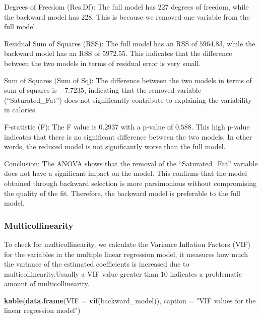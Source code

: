 \documentclass[
]{article}
\newenvironment{Shaded}{\begin{snugshade}}{\end{snugshade}}
\newcommand{\AttributeTok}[1]{\textcolor[rgb]{0.13,0.29,0.53}{#1}}
\newcommand{\FunctionTok}[1]{\textcolor[rgb]{0.13,0.29,0.53}{\textbf{#1}}}
\newcommand{\NormalTok}[1]{#1}
\newcommand{\StringTok}[1]{\textcolor[rgb]{0.31,0.60,0.02}{#1}}
\begin{document}
Degrees of Freedom (Res.Df): The full model has \(227\) degrees of
freedom, while the backward model has \(228\). This is because we
removed one variable from the full model.

Residual Sum of Squares (RSS): The full model has an RSS of \(5964.83\),
while the backward model has an RSS of \(5972.55\). This indicates that
the difference between the two models in terms of residual error is very
small.

Sum of Squares (Sum of Sq): The difference between the two models in
terms of sum of squares is \(-7.7235\), indicating that the removed
variable (``Saturated\_Fat'') does not significantly contribute to
explaining the variability in calories.

F-statistic (F): The F value is \(0.2937\) with a p-value of \(0.588\).
This high p-value indicates that there is no significant difference
between the two models. In other words, the reduced model is not
significantly worse than the full model.

Conclusion: The ANOVA shows that the removal of the ``Saturated\_Fat''
variable does not have a significant impact on the model. This confirms
that the model obtained through backward selection is more parsimonious
without compromising the quality of the fit. Therefore, the backward
model is preferable to the full model.

\subsubsection{Multicollinearity}\label{multicollinearity}

To check for multicollinearity, we calculate the Variance Inflation
Factors (VIF) for the variables in the multiple linear regression model,
it measures how much the variance of the estimated coefficients is
increased due to multicollinearity.Usually a VIF value greater than
\(10\) indicates a problematic amount of multicollinearity.

\begin{Shaded}
\begin{Highlighting}[]
\FunctionTok{kable}\NormalTok{(}\FunctionTok{data.frame}\NormalTok{(}\AttributeTok{VIF =} \FunctionTok{vif}\NormalTok{(backward\_model)),}
      \AttributeTok{caption =} \StringTok{"VIF values for the linear regression model"}\NormalTok{)}
\end{Highlighting}
\end{Shaded}
\end{document}
